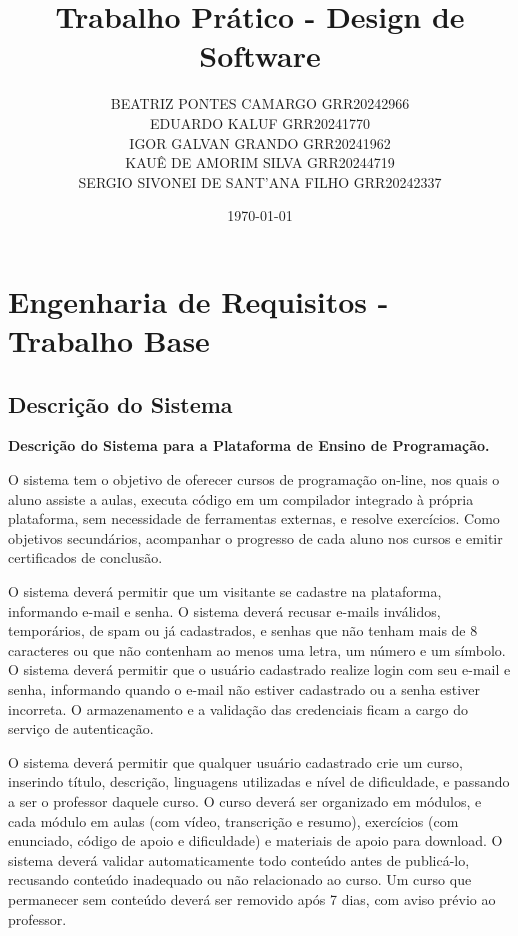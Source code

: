 \documentclass[11pt,a4paper]{article}
\title{Trabalho Prático - Design de Software}
\author{
  BEATRIZ PONTES CAMARGO GRR20242966\\
  EDUARDO KALUF GRR20241770\\
  IGOR GALVAN GRANDO GRR20241962\\
  KAUÊ DE AMORIM SILVA GRR20244719\\
  SERGIO SIVONEI DE SANT'ANA FILHO GRR20242337}
\date{\today}
\begin{document}
  \maketitle

  \section{Engenharia de Requisitos - Trabalho Base}\label{sec:engenharia-de-requisitos---trabalho-base}

  \subsection{Descrição do Sistema}\label{subsec:descricao-do-sistema}

  \textbf{Descrição do Sistema para a Plataforma de Ensino de Programação.}

  O sistema tem o objetivo de oferecer cursos de programação on-line, nos quais
  o aluno assiste a aulas, executa código em um compilador integrado à própria
  plataforma, sem necessidade de ferramentas externas, e resolve exercícios.
  Como objetivos secundários, acompanhar o progresso de cada aluno nos cursos e
  emitir certificados de conclusão.

  O sistema deverá permitir que um visitante se cadastre na plataforma,
  informando e-mail e senha. O sistema deverá recusar e-mails inválidos,
  temporários, de spam ou já cadastrados, e senhas que não tenham mais de 8
  caracteres ou que não contenham ao menos uma letra, um número e um símbolo. O sistema deverá permitir que o
  usuário cadastrado realize login com seu e-mail e senha, informando quando o
  e-mail não estiver cadastrado ou a senha estiver incorreta. O armazenamento e
  a validação das credenciais ficam a cargo do serviço de autenticação.

  O sistema deverá permitir que qualquer usuário cadastrado crie um curso,
  inserindo título, descrição, linguagens utilizadas e nível de dificuldade, e
  passando a ser o professor daquele curso. O curso deverá ser organizado em
  módulos, e cada módulo em aulas (com vídeo, transcrição e resumo), exercícios
  (com enunciado, código de apoio e dificuldade) e materiais de apoio para
  download. O sistema deverá validar automaticamente todo conteúdo antes de
  publicá-lo, recusando conteúdo inadequado ou não relacionado ao curso. Um
  curso que permanecer sem conteúdo deverá ser removido após 7 dias, com aviso
  prévio ao professor.
\end{document}
